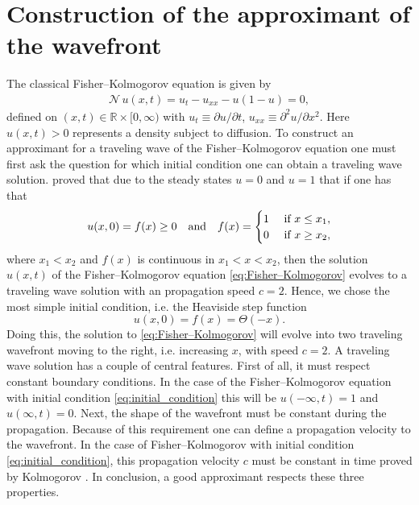 \documentclass[amsmath,amssymb,amsfonts,aps,pre,preprint,superscriptaddress,bibnotes,showpacs,showkeys,longbibliography]{revtex4-1}
\newcommand*{\nlop}{\mathcal{N}\,}
\begin{document}
\section{Construction of the approximant of the wavefront} \label{sec:constructing_approximant}
The classical Fisher–Kolmogorov equation is given by
\begin{align}\label{eq:Fisher–Kolmogorov}
    \nlop u(x,t)=u_t - u_{xx} -u(1-u)=0,
\end{align}
defined on $(x,t) \in \mathbb{R} \times [0,\infty)$ with $u_t\equiv\partial u / \partial t$,  $u_{xx}\equiv\partial^2 u / \partial x^2$. Here $u(x,t)>0$ represents a density subject to diffusion.
To construct an approximant for a traveling wave of the Fisher–Kolmogorov equation one must first ask the question for which initial condition one can obtain a traveling wave solution. \citet{kolmogorov1937study} proved that due to the steady states $u=0$ and $u=1$ that if one has that
\begin{align}\label{eq:kolmogorov criteria}
	u(x, 0)=f(x) \geq 0 \qq{and} f(x)= \begin{cases}1 & \text { if } x \leq x_{1}, \\ 0 & \text { if } x \geq x_{2},\end{cases}
\end{align}
where $x_{1}<x_{2}$ and $f(x)$ is continuous in $x_{1}<x<x_{2}$, then the solution $u(x, t)$ of the Fisher–Kolmogorov equation \eqref{eq:Fisher–Kolmogorov} evolves to a traveling wave solution with an propagation speed $c=2$. Hence, we chose the most simple initial condition, i.e. the Heaviside step function 
\begin{equation}
    \label{eq:initial_condition}
    u(x,0)=f(x)=\Theta(-x).
\end{equation}
Doing this, the solution to \eqref{eq:Fisher–Kolmogorov} will evolve into two traveling wavefront moving to the right, i.e. increasing $x$, with speed $c = 2$. A traveling wave solution has a couple of central features. First of all, it must respect constant boundary conditions. In the case of the Fisher–Kolmogorov equation with initial condition \eqref{eq:initial_condition} this will be $u(-\infty, t)=1$ and $u(\infty, t)=0$. Next, the shape of the wavefront must be constant during the propagation. Because of this requirement one can define a propagation velocity to the wavefront. In the case of Fisher–Kolmogorov with initial condition \eqref{eq:initial_condition}, this propagation velocity $c$ must be constant in time proved by Kolmogorov \cite{kolmogorov1937study}. In conclusion, a good approximant respects these three properties.
\end{document}
